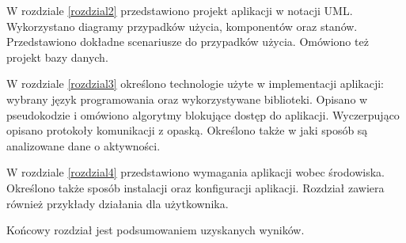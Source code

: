 W rozdziale \ref{rozdzial2} przedstawiono projekt aplikacji w notacji UML. Wykorzystano diagramy przypadków użycia, komponentów oraz stanów. Przedstawiono dokładne scenariusze do przypadków użycia. Omówiono też projekt bazy danych.

W rozdziale \ref{rozdzial3} określono technologie użyte w implementacji aplikacji: wybrany język programowania oraz wykorzystywane biblioteki. Opisano w pseudokodzie i omówiono algorytmy blokujące dostęp do aplikacji. Wyczerpująco opisano protokoły komunikacji z opaską. Określono także w jaki sposób są analizowane dane o aktywności.

W rozdziale \ref{rozdzial4} przedstawiono wymagania aplikacji wobec środowiska. Określono także sposób instalacji oraz konfiguracji aplikacji. Rozdział zawiera również przykłady działania dla użytkownika.

Końcowy rozdział jest podsumowaniem uzyskanych wyników.



